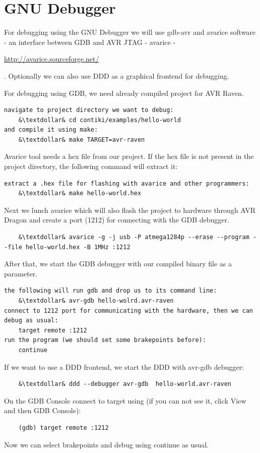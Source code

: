 \documentclass{article}
\begin{document}
\section{GNU Debugger}
For debugging using the GNU Debugger we will use gdb-avr and avarice software -
an interface between GDB and AVR JTAG - avarice - {\url{http://avarice.sourceforge.net/}{.
Optionally we can also use DDD as a graphical frontend for debugging.

For debugging using GDB, we need already compiled project for AVR Raven.
\begin{lstlisting}
navigate to project directory we want to debug:
	&\textdollar& cd contiki/examples/hello-world
and compile it using make:
	&\textdollar& make TARGET=avr-raven
\end{lstlisting}
Avarice tool needs a hex file from our project.
If the hex file is not present in the project directory, the following command will extract it:
\begin{lstlisting}
extract a .hex file for flashing with avarice and other programmers:
	&\textdollar& make hello-world.hex
\end{lstlisting}

Next we lunch avarice which will also flash the project to hardware
through AVR Dragon and
create a port (1212) for connecting with the GDB debugger.
\begin{lstlisting}
	&\textdollar& avarice -g -j usb -P atmega1284p --erase --program --file hello-world.hex -B 1MHz :1212
\end{lstlisting}
After that, we start the GDB debugger with our compiled binary file as a parameter.
\begin{lstlisting}
the following will run gdb and drop us to its command line:
	&\textdollar& avr-gdb hello-wolrd.avr-raven
connect to 1212 port for communicating with the hardware, then we can debug as usual:
	target remote :1212
run the program (we should set some brakepoints before):
	continue
\end{lstlisting}
If we want to use a DDD frontend, we start the DDD with avr-gdb debugger:
\begin{lstlisting}
	&\textdollar& ddd --debugger avr-gdb  hello-world.avr-raven
\end{lstlisting}
On the GDB Console connect to target using (if you can not see it, click View and then GDB Console):
\begin{lstlisting}
	(gdb) target remote :1212
\end{lstlisting}
Now we can select brakepoints and debug using continue as usual.

}}
\end{document}

